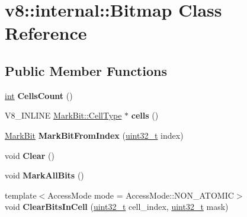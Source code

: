 \hypertarget{classv8_1_1internal_1_1Bitmap}{}\section{v8\+:\+:internal\+:\+:Bitmap Class Reference}
\label{classv8_1_1internal_1_1Bitmap}
\subsection*{Public Member Functions}
\begin{DoxyCompactItemize}
\item 
\mbox{\label{classv8_1_1internal_1_1Bitmap_af6f993e843f40bdb1cc71e3243ee0fc4}} 
\mbox{\hyperlink{classint}{int}} {\bfseries Cells\+Count} ()
\item 
\mbox{\label{classv8_1_1internal_1_1Bitmap_ad2b7374cc1eb4e243877d6e5315a7237}} 
V8\+\_\+\+I\+N\+L\+I\+NE \mbox{\hyperlink{classuint32__t}{Mark\+Bit\+::\+Cell\+Type}} $\ast$ {\bfseries cells} ()
\item 
\mbox{\label{classv8_1_1internal_1_1Bitmap_a9a314b5d6a0ae6ca7acd98c42f34145d}} 
\mbox{\hyperlink{classv8_1_1internal_1_1MarkBit}{Mark\+Bit}} {\bfseries Mark\+Bit\+From\+Index} (\mbox{\hyperlink{classuint32__t}{uint32\+\_\+t}} index)
\item 
\mbox{\label{classv8_1_1internal_1_1Bitmap_ad0b68d9f8390826c5ff192714d21af11}} 
void {\bfseries Clear} ()
\item 
\mbox{\label{classv8_1_1internal_1_1Bitmap_a2db95efa426218c20c260ab060bf9460}} 
void {\bfseries Mark\+All\+Bits} ()
\item 
\mbox{\label{classv8_1_1internal_1_1Bitmap_a5115383763ec243c135098f54f5398b0}} 
{\footnotesize template$<$Access\+Mode mode = Access\+Mode\+::\+N\+O\+N\+\_\+\+A\+T\+O\+M\+IC$>$ }\\void {\bfseries Clear\+Bits\+In\+Cell} (\mbox{\hyperlink{classuint32__t}{uint32\+\_\+t}} cell\+\_\+index, \mbox{\hyperlink{classuint32__t}{uint32\+\_\+t}} mask)
\item 
\mbox{\label{classv8_1_1internal_1_1Bitmap_a26189e45d43cead44f23a0349d5933f9}} 

\end{DoxyCompactItemize}
